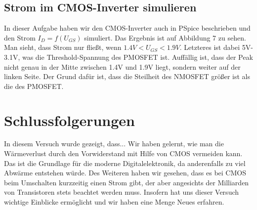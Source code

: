 \documentclass[12pt,a4paper]{scrartcl}
\begin{document}
\subsection{Strom im CMOS-Inverter simulieren}
In dieser Aufgabe haben wir den CMOS-Inverter auch in PSpice beschrieben und den Strom $I_D=f(U_{GS})$ simuliert.
Das Ergebnis ist auf Abbildung 7 zu sehen.
Man sieht, dass Strom nur flie\ss t, wenn $1.4V < U_{GS} < 1.9V$.
Letzteres ist dabei 5V-3.1V, was die Threshold-Spannung des PMOSFET ist.
Auff\"allig ist, dass der Peak nicht genau in der Mitte zwischen 1.4V und 1.9V liegt, sondern weiter auf der linken Seite.
Der Grund daf\"ur ist, dass die Steilheit des NMOSFET gr\"o\ss er ist als die des PMOSFET.

\section{Schlussfolgerungen}
In diesem Versuch wurde gezeigt, dass...
Wir haben gelernt, wie man die W\"armeverlust durch den Vorwiderstand mit Hilfe von CMOS vermeiden kann.
Das ist die Grundlage f\"ur die moderne Digitalelektronik, da anderenfalls zu viel Abw\"arme entstehen w\"urde.
Des Weiteren haben wir gesehen, dass es bei CMOS beim Umschalten kurzzeitig einen Strom gibt, der aber angesichts der Milliarden von Transistoren stets beachtet werden muss.
Insofern hat uns dieser Versuch wichtige Einblicke erm\"oglicht und wir haben eine Menge Neues erfahren.
\end{document}
